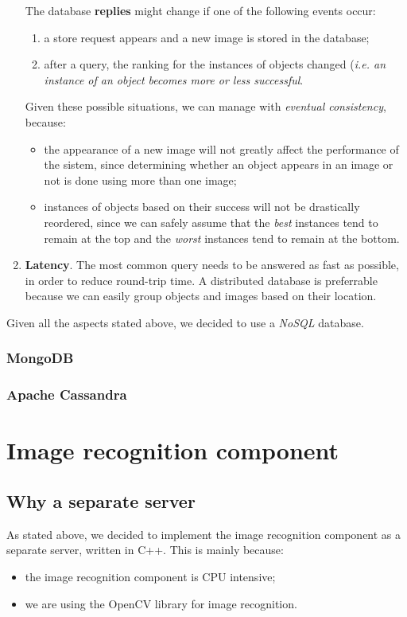 \documentclass[a4paper,onecolumn,oneside,titlepage,12pt]{report}
\begin{document}
\begin{enumerate}
		The database \textbf{replies} might change if one of the following events occur:
		\begin{enumerate}
			\item a store request appears and a new image is stored in the database;
			\item after a query, the ranking for the instances of objects changed (\emph{i.e. an instance of an object becomes more or less successful}.
		\end{enumerate}
		Given these possible situations, we can manage with \emph{eventual consistency}, because:
		\begin{itemize}
			\item the appearance of a new image will not greatly affect the performance of the sistem, since determining whether an object appears in an image or not is done using more than one image;
			\item instances of objects based on their success will not be drastically reordered, since we can safely assume that the \emph{best} instances tend to remain at the top and the \emph{worst} instances tend to remain at the bottom.
		\end{itemize}
		\item \textbf{Latency}. The most common query needs to be answered as fast as possible, in order to reduce round-trip time. A distributed database is preferrable because we can easily group objects and images based on their location.
	\end{enumerate}
	
	Given all the aspects stated above, we decided to use a \emph{NoSQL} database.
	\subsubsection{MongoDB}
	\subsubsection{Apache Cassandra}
	
\section{Image recognition component}
\subsection{Why a separate server}
As stated above, we decided to implement the image recognition component as a separate server, written in C++. This is mainly because:
\begin{itemize}
	\item the image recognition component is CPU intensive;
	\item we are using the OpenCV library for image recognition.
\end{itemize}
\end{document}
